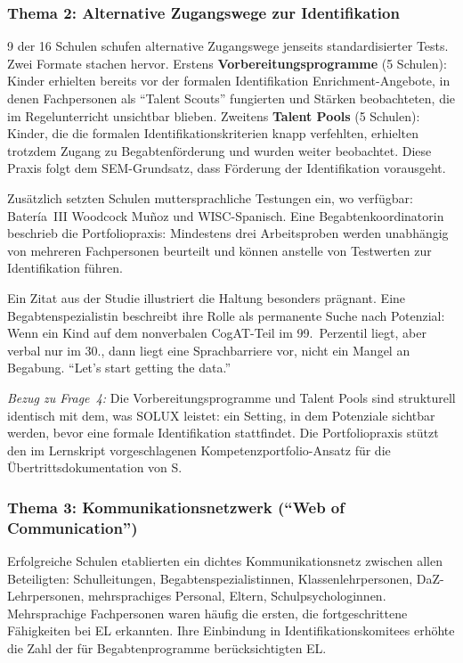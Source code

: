 \documentclass[ngerman, a4paper]{article}
\begin{document}
\subsubsection*{Thema 2: Alternative Zugangswege zur Identifikation}

9 der 16 Schulen schufen alternative Zugangswege jenseits standardisierter
Tests. Zwei Formate stachen hervor. Erstens \textbf{Vorbereitungsprogramme}
(5 Schulen): Kinder erhielten bereits vor der formalen Identifikation
Enrichment-Angebote, in denen Fachpersonen als \enquote{Talent Scouts}
fungierten und Stärken beobachteten, die im Regelunterricht unsichtbar
blieben. Zweitens \textbf{Talent Pools} (5 Schulen): Kinder, die die
formalen Identifikationskriterien knapp verfehlten, erhielten trotzdem
Zugang zu Begabtenförderung und wurden weiter beobachtet. Diese Praxis
folgt dem SEM-Grundsatz, dass Förderung der Identifikation vorausgeht.

Zusätzlich setzten Schulen muttersprachliche Testungen ein, wo verfügbar:
Batería~III Woodcock Muñoz und WISC-Spanisch. Eine
Begabtenkoordinatorin beschrieb die Portfoliopraxis: Mindestens drei
Arbeitsproben werden unabhängig von mehreren Fachpersonen beurteilt und
können anstelle von Testwerten zur Identifikation führen.

Ein Zitat aus der Studie illustriert die Haltung besonders prägnant. Eine
Begabtenspezialistin beschreibt ihre Rolle als permanente Suche nach
Potenzial: Wenn ein Kind auf dem nonverbalen CogAT-Teil im 99.~Perzentil
liegt, aber verbal nur im 30., dann liegt eine Sprachbarriere vor, nicht
ein Mangel an Begabung. \enquote{Let's start getting the data.}

\textit{Bezug zu Frage~4:} Die Vorbereitungsprogramme und Talent Pools
sind strukturell identisch mit dem, was SOLUX leistet: ein Setting, in dem
Potenziale sichtbar werden, bevor eine formale Identifikation stattfindet.
Die Portfoliopraxis stützt den im Lernskript vorgeschlagenen
Kompetenzportfolio-Ansatz für die Übertrittsdokumentation von S.

\subsubsection*{Thema 3: Kommunikationsnetzwerk (\enquote{Web of
  Communication})}

Erfolgreiche Schulen etablierten ein dichtes Kommunikationsnetz zwischen
allen Beteiligten: Schulleitungen, Begabtenspezialistinnen,
Klassenlehrpersonen, DaZ-Lehrpersonen, mehrsprachiges Personal, Eltern,
Schulpsychologinnen. Mehrsprachige Fachpersonen waren häufig die ersten,
die fortgeschrittene Fähigkeiten bei EL erkannten. Ihre Einbindung in
Identifikationskomitees erhöhte die Zahl der für Begabtenprogramme
berücksichtigten EL.
\end{document}
